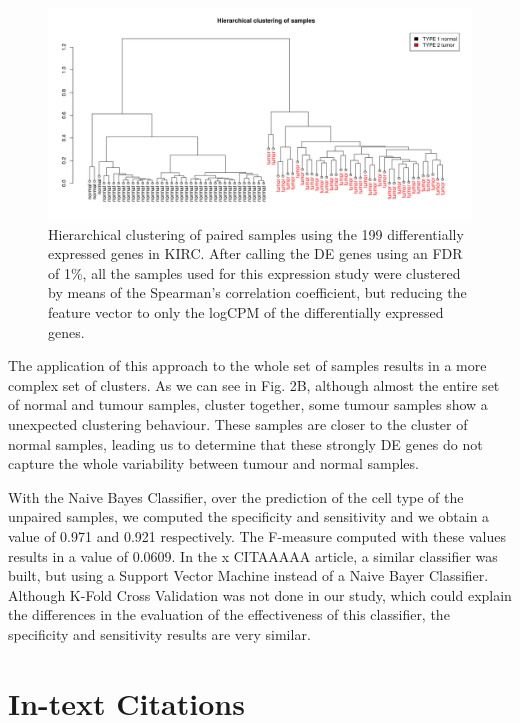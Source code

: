 \documentclass[9pt,twocolumn,twoside]{gsajnl}
\begin{document}
\begin{figure}[htbp]
\centering
\includegraphics[width=\textwidth]{figures/fig2.png}
\caption{Hierarchical clustering of paired samples using the 199 differentially expressed genes in KIRC. After calling the DE genes using an FDR of 1\%, all the samples used for this expression study were clustered by means of the Spearman's correlation coefficient, but reducing the feature vector to only the logCPM of the differentially expressed genes. }%
\label{fig:spectrum}
\end{figure}

The application of this approach to the whole set of samples results in a more complex set of clusters. As we can see in Fig. 2B, although almost the entire set of normal and tumour samples, cluster together, some tumour samples show a unexpected clustering behaviour. These samples are closer to the cluster of normal samples, leading us to determine that these strongly DE genes do not capture the whole variability between tumour and normal samples.

With the Naive Bayes Classifier, over the prediction of the cell type of the unpaired samples, we computed the specificity and sensitivity and we obtain a value of 0.971 and 0.921 respectively. The F-measure computed with these values results in a value of 0.0609. In the x CITAAAAA article, a similar classifier was built, but using a Support Vector Machine instead of a Naive Bayer Classifier. Although K-Fold Cross Validation was not done in our study, which could explain the differences in the evaluation of the effectiveness of this classifier, the specificity and sensitivity results are very similar.


\section*{In-text Citations}
\end{document}
